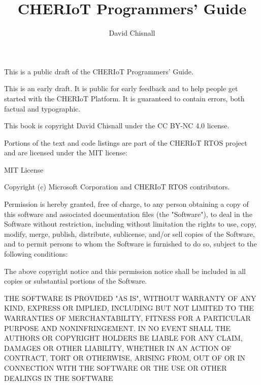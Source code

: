 \title{CHERIoT Programmers' Guide}
\author{David Chisnall}

\if[output=sile]{\eject{}\par{}}

This is a public draft of the CHERIoT Programmers' Guide.

\begin{warning}
This is an early draft.
It is public for early feedback and to help people get started with the CHERIoT Platform.
It is guaranteed to contain errors, both factual and typographic.
\end{warning}

This book is copyright David Chisnall under the CC BY-NC 4.0 license.

Portions of the text and code listings are part of the CHERIoT RTOS project and are licensed under the MIT license:

MIT License

Copyright (c) Microsoft Corporation and CHERIoT RTOS contributors.

Permission is hereby granted, free of charge, to any person obtaining a copy
of this software and associated documentation files (the "Software"), to deal
in the Software without restriction, including without limitation the rights
to use, copy, modify, merge, publish, distribute, sublicense, and/or sell
copies of the Software, and to permit persons to whom the Software is
furnished to do so, subject to the following conditions:

The above copyright notice and this permission notice shall be included in all
copies or substantial portions of the Software.

THE SOFTWARE IS PROVIDED "AS IS", WITHOUT WARRANTY OF ANY KIND, EXPRESS OR
IMPLIED, INCLUDING BUT NOT LIMITED TO THE WARRANTIES OF MERCHANTABILITY,
FITNESS FOR A PARTICULAR PURPOSE AND NONINFRINGEMENT. IN NO EVENT SHALL THE
AUTHORS OR COPYRIGHT HOLDERS BE LIABLE FOR ANY CLAIM, DAMAGES OR OTHER
LIABILITY, WHETHER IN AN ACTION OF CONTRACT, TORT OR OTHERWISE, ARISING FROM,
OUT OF OR IN CONNECTION WITH THE SOFTWARE OR THE USE OR OTHER DEALINGS IN THE
SOFTWARE


















